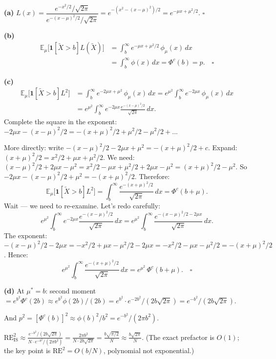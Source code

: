 \documentclass[12pt]{article}
\begin{document}
\textbf{(a)}
$L(x) = \dfrac{e^{-x^2/2}/\sqrt{2\pi}}{e^{-(x-\mu)^2/2}/\sqrt{2\pi}} = e^{-(x^2-(x-\mu)^2)/2} = e^{-\mu x + \mu^2/2}$. \quad $\square$

\textbf{(b)}
\begin{align*}
\mathbb{E}_\mu\!\bigl[\mathbf{1}[\tilde{X}>b]L(\tilde{X})\bigr]
&= \int_b^\infty e^{-\mu x+\mu^2/2}\,\phi_\mu(x)\,dx \\
&= \int_b^\infty \phi(x)\,dx = \Phi^c(b) = p. \quad \square
\end{align*}

\textbf{(c)}
\begin{align*}
\mathbb{E}_\mu\!\bigl[\mathbf{1}[\tilde{X}>b]L^2\bigr]
&= \int_b^\infty e^{-2\mu x+\mu^2}\,\phi_\mu(x)\,dx
= e^{\mu^2}\int_b^\infty e^{-2\mu x}\,\phi_\mu(x)\,dx \\
&= e^{\mu^2}\int_b^\infty e^{-2\mu x} \frac{e^{-(x-\mu)^2/2}}{\sqrt{2\pi}}\,dx.
\end{align*}
Complete the square in the exponent:
$-2\mu x - (x-\mu)^2/2 = -(x+\mu)^2/2 + \mu^2/2 - \mu^2/2 + ...$

More directly: write $-(x-\mu)^2/2 - 2\mu x + \mu^2 = -(x+\mu)^2/2 + c$. Expand:
$(x+\mu)^2/2 = x^2/2 + \mu x + \mu^2/2$.
We need: $(x-\mu)^2/2 + 2\mu x - \mu^2 = x^2/2 - \mu x + \mu^2/2 + 2\mu x - \mu^2 = (x+\mu)^2/2 - \mu^2$.
So $-2\mu x - (x-\mu)^2/2 + \mu^2 = -(x+\mu)^2/2$.
Therefore:
\[
  \mathbb{E}_\mu\!\bigl[\mathbf{1}[\tilde{X}>b]L^2\bigr]
  = \int_b^\infty \frac{e^{-(x+\mu)^2/2}}{\sqrt{2\pi}}\,dx
  = \Phi^c(b + \mu).
\]
Wait --- we need to re-examine. Let's redo carefully:
\[
  e^{\mu^2}\int_b^\infty e^{-2\mu x} \frac{e^{-(x-\mu)^2/2}}{\sqrt{2\pi}}\,dx
  = e^{\mu^2}\int_b^\infty \frac{e^{-(x-\mu)^2/2 - 2\mu x}}{\sqrt{2\pi}}\,dx.
\]
The exponent: $-(x-\mu)^2/2 - 2\mu x = -x^2/2 + \mu x - \mu^2/2 - 2\mu x = -x^2/2 - \mu x - \mu^2/2 = -(x+\mu)^2/2$.
Hence:
\[
  e^{\mu^2}\int_b^\infty \frac{e^{-(x+\mu)^2/2}}{\sqrt{2\pi}}\,dx
  = e^{\mu^2}\,\Phi^c(b+\mu). \quad \square
\]

\textbf{(d)} At $\mu^* = b$:
second moment $= e^{b^2}\Phi^c(2b) \approx e^{b^2}\phi(2b)/(2b) = e^{b^2}\cdot e^{-2b^2}/(2b\sqrt{2\pi}) = e^{-b^2}/(2b\sqrt{2\pi})$.

And $p^2 = [\Phi^c(b)]^2 \approx \phi(b)^2/b^2 = e^{-b^2}/(2\pi b^2)$.

$\mathrm{RE}_{\mathrm{IS}}^2 \approx \frac{e^{-b^2}/(2b\sqrt{2\pi})}{N \cdot e^{-b^2}/(2\pi b^2)} = \frac{2\pi b^2}{N \cdot 2b\sqrt{2\pi}} = \frac{b\sqrt{\pi/2}}{N} \approx \frac{b\sqrt{2\pi}}{N}$.
(The exact prefactor is $O(1)$; the key point is $\mathrm{RE}^2 = O(b/N)$, polynomial not exponential.)
\end{document}
